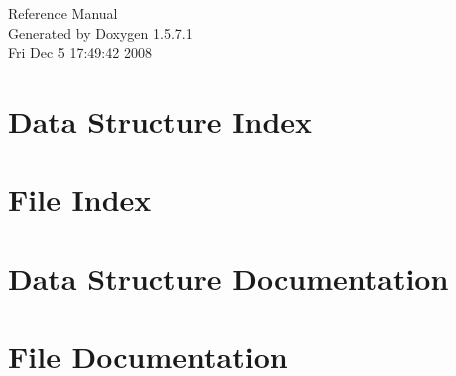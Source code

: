 \documentclass[a4paper]{book}
\begin{document}
\begin{titlepage}
\vspace*{7cm}
\begin{center}
{\Large Reference Manual}\\
\vspace*{1cm}
{\large Generated by Doxygen 1.5.7.1}\\
\vspace*{0.5cm}
{\small Fri Dec 5 17:49:42 2008}\\
\end{center}
\end{titlepage}
\clearemptydoublepage
{}
\tableofcontents
\clearemptydoublepage
{}
\chapter{Data Structure Index}

\chapter{File Index}

\chapter{Data Structure Documentation}








\chapter{File Documentation}











\printindex
\end{document}
